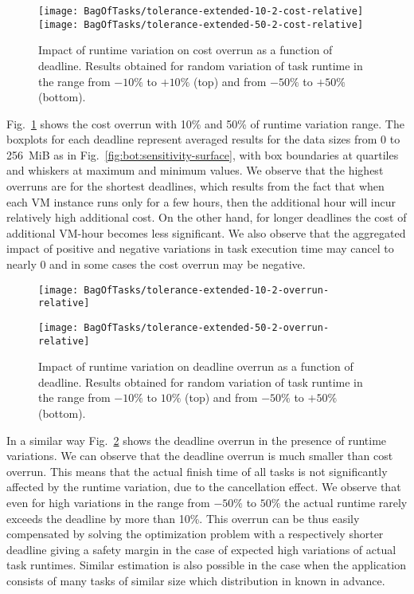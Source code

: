 {  \begin{figure}[tb]
     \centering
     \texttt{[image: BagOfTasks/tolerance-extended-10-2-cost-relative]}  
     \texttt{[image: BagOfTasks/tolerance-extended-50-2-cost-relative]}  
 	   \caption{Impact of runtime variation on cost overrun as a function of deadline. 
 	   Results obtained for random variation of task runtime in the range from $-10\%$ to $+10\%$ (top)
 	   and from $-50\%$ to $+50\%$ (bottom). }
 	   \label{fig:bot:dynamic-cost}
  \end{figure} 
  
  Fig.~\ref{fig:bot:dynamic-cost} shows the cost overrun with 10\% and 50\%  of runtime
  variation range.  The boxplots for each deadline represent averaged
  results for the data sizes from 0 to 256 MiB as in
  Fig.~\ref{fig:bot:sensitivity-surface}, with box boundaries at quartiles
  and whiskers at maximum and minimum values. We observe that the highest
  overruns are for the shortest deadlines, which results from the fact that
  when each VM instance runs only for a few hours, then the additional hour
  will incur relatively high additional cost. On the other hand, for longer
  deadlines the cost of additional VM-hour becomes less significant. We also
  observe that the aggregated impact of positive and negative variations in
  task execution time may cancel to nearly $0$ and in some cases the cost
  overrun may be negative.

  \begin{figure}[tb]
     \centering
     \texttt{[image: BagOfTasks/tolerance-extended-10-2-overrun-relative]}  
     
   \texttt{[image: BagOfTasks/tolerance-extended-50-2-overrun-relative]}  
 	   \caption{Impact of runtime variation on deadline overrun as a function of deadline. 
 	   Results obtained for random variation of task runtime in the range from $ -10\%$ to $10\%$ (top)
 	   and from $-50\%$ to $+50\%$ (bottom). }
 	   \label{fig:bot:dynamic-time}
  \end{figure} 

  In a similar way Fig.~\ref{fig:bot:dynamic-time} shows the deadline overrun in
  the presence of runtime variations. We can observe that the deadline overrun
  is much smaller than cost overrun. This means that the actual finish time of
  all tasks is not significantly affected by the runtime variation, due to the
  cancellation effect. We observe that even for high variations in the range
  from $-50\%$ to $50\%$ the actual runtime rarely exceeds the deadline by
  more than 10\%. This overrun can be thus easily compensated by solving the
  optimization problem with a respectively shorter deadline giving a safety
  margin in the case of expected high variations of actual task runtimes. Similar estimation is also possible in the case when the application consists of many tasks of similar size which distribution in known in advance. 
	


}

